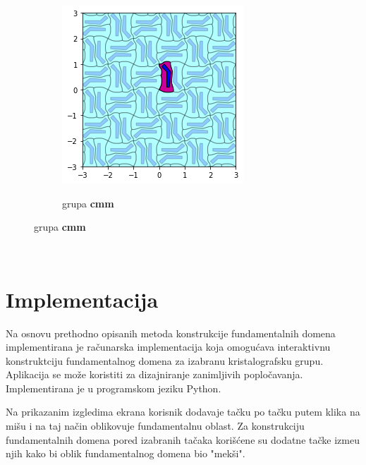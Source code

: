 \documentclass[11pt]{article}
\begin{document}
\begin{samepage}
\begin{figure}[H]
\begin{subfigure}[b]{0.3\textwidth}
  \end{subfigure}
  \begin{subfigure}[b]{0.3\textwidth}
    \includegraphics[width=\textwidth]{output_21_7.png}
    \label{fig:f25}
    \caption{grupa \textbf{cmm}}
  \end{subfigure}
\end{figure}
\end{samepage}

\quad \\ \qquad
    \section{Implementacija}\label{implementacija}

    Na osnovu prethodno opisanih metoda konstrukcije fundamentalnih domena implementirana je ra\v cunarska implementacija koja omogu\' cava interaktivnu konstruktciju fundamentalnog domena za izabranu kristalografsku grupu.
Aplikacija se mo\v ze koristiti za dizajniranje zanimljivih poplo\v cavanja.
Implementirana je u programskom jeziku Python.

Na prikazanim izgledima ekrana korisnik dodavaje ta\v cku po ta\v cku putem klika na mi\v su i na taj na\v cin oblikovuje fundamentalnu oblast. Za konstrukciju fundamentalnih domena pored izabranih ta\v caka kori\v s\' cene su dodatne ta\v cke izme\dj u njih kako bi oblik fundamentalnog domena bio "mek\v si". 
\end{document}
